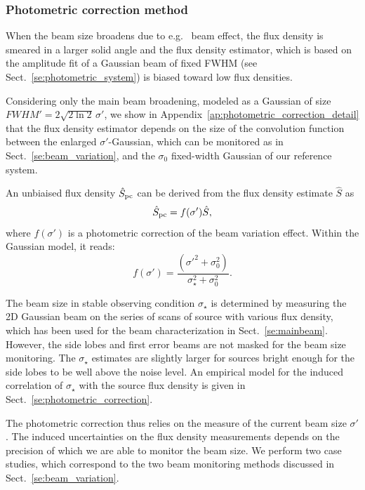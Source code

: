 \subsubsection{Photometric correction method}
\label{se:photometric_correction_method}

When the beam size broadens due to e.g. \afternoon\ beam effect, the
flux density is smeared in a larger solid angle and
the flux density estimator, which is based on the amplitude fit of a
Gaussian beam of fixed FWHM (see
Sect.~\ref{se:photometric_system}) is biased toward low flux
densities.

Considering only the main beam broadening, modeled as a Gaussian of
size $FWHM' = 2 \sqrt{2\ln{2}} \, \sigma '$, we show in
Appendix~\ref{ap:photometric_correction_detail} that
the flux density estimator depends on the size of the convolution
function between the enlarged $\sigma '$-Gaussian, which can be
monitored as in Sect.~\ref{se:beam_variation}, and the 
$\sigma_0$ fixed-width Gaussian of our reference system.

An unbiaised
flux density $\hat{S}_{\rm{pc}}$ can be derived from the flux density
estimate $\hat{S}$ as
\begin{equation}
  \hat{S}_{\rm{pc}} = f(\sigma')\hat{S},
\end{equation}
where $f(\sigma')$ is a photometric correction of the beam variation
effect. Within the Gaussian model, it reads:
\begin{equation}
  f(\sigma') = \frac{(\sigma'^2 + \sigma_0^2)}{\sigma_{\star}^2 + \sigma_0^2}. 
\end{equation} 

The beam size in stable observing condition $\sigma_\star$ is
determined by measuring the 2D Gaussian beam on the series of scans of
source with various flux density, which has been used for the beam
characterization in Sect.~\ref{se:mainbeam}. However, the side lobes
and first error beams are not masked for the beam size
monitoring. The $\sigma_\star$ estimates are slightly
larger for sources bright enough for the side lobes to be well above
the noise level. An empirical model for the induced correlation of
$\sigma_\star$ with the source flux density is given in
Sect.~\ref{se:photometric_correction}.

The photometric correction thus relies on the measure of the current beam
size $\sigma'$. The induced uncertainties on the flux density
measurements depends on the precision of which we are able to monitor
the beam size. We perform two case studies, which correspond to the
two beam monitoring methods discussed in
Sect.~\ref{se:beam_variation}.\\

